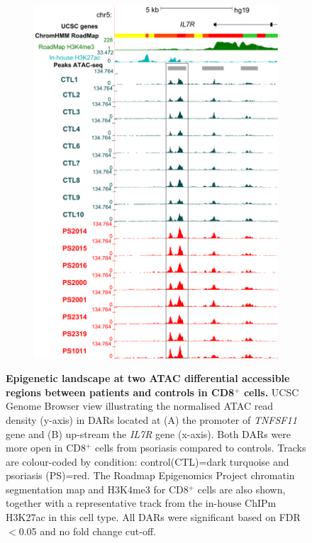 \begin{figure}[htbp]
\begin{subfigure}{0.45\textwidth}
\includegraphics[width=\textwidth]{./Results2/pdfs/UCSC_ATAC_CD8_normalised_peak_enh_IL7R}
\caption{\textbf{}}
\end{subfigure}
\caption[Epigenetic landscape at two ATAC differential accessible regions between patients and controls in CD8$^+$ cells.]{\textbf{Epigenetic landscape at two ATAC differential accessible regions between patients and controls in CD8$^+$ cells.} UCSC Genome Browser view illustrating the normalised ATAC read density (y-axis) in DARs located at (A) the promoter of \textit{TNFSF11} gene and (B) up-stream the \textit{IL7R} gene (x-axis). Both DARs were more open in CD8$^+$ cells from psoriasis compared to controls. Tracks are colour-coded by condition: control(CTL)=dark turquoise and psoriasis (PS)=red. The Roadmap Epigenomics Project chromatin segmentation map and H3K4me3 for CD8$^+$ cells are also shown, together with a representative track from the in-house ChIPm H3K27ac in this cell type. All DARs were significant based on FDR$<$0.05 and no fold change cut-off.}
\label{figure:ATAC_PS_CTL_CD8_TNFSF11_IL7R_tracks}
\end{figure} 



